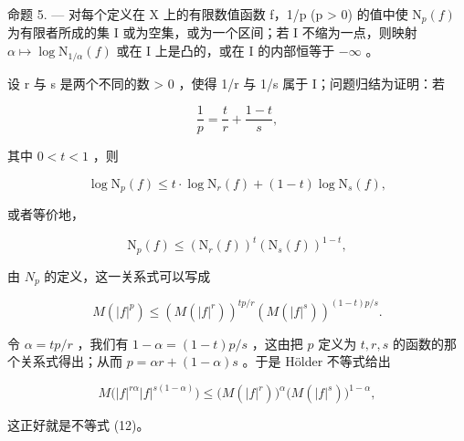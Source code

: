 命题 5. --- 对每个定义在 X 上的有限数值函数 f，1/p (p \textgreater{} 0) 的值中使 \(\mathrm{N}_{p}(f)\) 为有限者所成的集 I 或为空集，或为一个区间；若 I 不缩为一点，则映射 \(\alpha \mapsto \log \mathrm{N}_{1/\alpha}(f)\) 或在 I 上是凸的，或在 I 的内部恒等于 \(-\infty\) 。

设 r 与 s 是两个不同的数 \textgreater{} 0 ，使得 1/r 与 1/s 属于 I；问题归结为证明：若

\[
{\frac {1}{p}} = {\frac {t}{r}} + {\frac {1 - t}{s}},
\]

其中 \(0 < t < 1\) ，则

\[
\log \mathrm{N} _ {p} (f) \leqslant t \cdot \log \mathrm{N} _ {r} (f) + (1 - t) \log \mathrm{N} _ {s} (f),\tag{10}
\]

或者等价地，

\[
\mathrm{N} _ {p} (f) \leqslant \left(\mathrm{N} _ {r} (f)\right) ^ {t} \left(\mathrm{N} _ {s} (f)\right) ^ {1 - t},\tag{11}
\]

由 \(N_{p}\) 的定义，这一关系式可以写成

\[
M (| f | ^ {p}) \leqslant \left(M (| f | ^ {r})\right) ^ {t p / r} \left(M (| f | ^ {s})\right) ^ {(1 - t) p / s}.\tag{12}
\]

令 \(\alpha = tp / r\) ，我们有 \(1 - \alpha = (1 - t)p / s\) ，这由把 \(p\) 定义为 \(t, r, s\) 的函数的那个关系式得出；从而 \(p = \alpha r + (1 - \alpha)s\) 。于是 Hölder 不等式给出

\[
M \big (| f | ^ {r \alpha} | f | ^ {s (1 - \alpha)} \big) \leqslant \big (M (| f | ^ {r}) \big) ^ {\alpha} \big (M (| f | ^ {s}) \big) ^ {1 - \alpha},
\]

这正好就是不等式 (12)。

